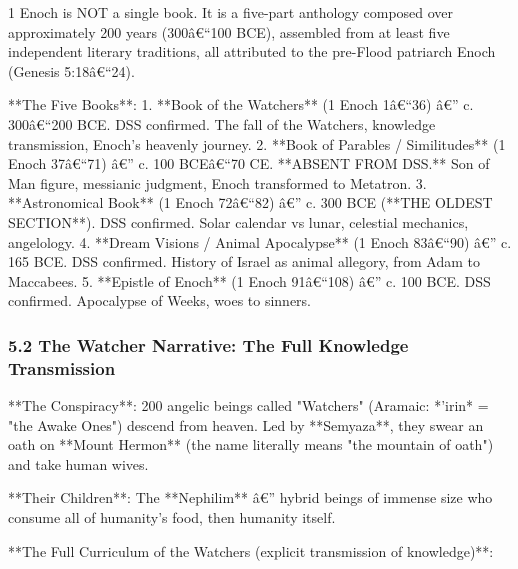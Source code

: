 \documentclass[aps,prd,11pt,onecolumn,superscriptaddress,nofootinbib,floatfix]{revtex4-2}
\begin{document}
1 Enoch is NOT a single book. It is a five-part anthology composed over approximately 200 years (300â€``100 BCE), assembled from at least five independent literary traditions, all attributed to the pre-Flood patriarch Enoch (Genesis 5:18â€``24).


**The Five Books**:
1. **Book of the Watchers** (1 Enoch 1â€``36) â€'' c. 300â€``200 BCE. DSS confirmed. The fall of the Watchers, knowledge transmission, Enoch's heavenly journey.
2. **Book of Parables / Similitudes** (1 Enoch 37â€``71) â€'' c. 100 BCEâ€``70 CE. **ABSENT FROM DSS.** Son of Man figure, messianic judgment, Enoch transformed to Metatron.
3. **Astronomical Book** (1 Enoch 72â€``82) â€'' c. 300 BCE (**THE OLDEST SECTION**). DSS confirmed. Solar calendar vs lunar, celestial mechanics, angelology.
4. **Dream Visions / Animal Apocalypse** (1 Enoch 83â€``90) â€'' c. 165 BCE. DSS confirmed. History of Israel as animal allegory, from Adam to Maccabees.
5. **Epistle of Enoch** (1 Enoch 91â€``108) â€'' c. 100 BCE. DSS confirmed. Apocalypse of Weeks, woes to sinners.


\subsubsection{5.2 The Watcher Narrative: The Full Knowledge Transmission}


**The Conspiracy**: 200 angelic beings called "Watchers" (Aramaic: *'irin* = "the Awake Ones") descend from heaven. Led by **Semyaza**, they swear an oath on **Mount Hermon** (the name literally means "the mountain of oath") and take human wives.


**Their Children**: The **Nephilim** â€'' hybrid beings of immense size who consume all of humanity's food, then humanity itself.


**The Full Curriculum of the Watchers (explicit transmission of knowledge)**:
\end{document}
